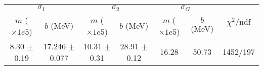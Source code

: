\begin{tabular}{cc|cc|cc||c}
\multicolumn{2}{c|}{$\sigma_1$} & \multicolumn{2}{|c}{$\sigma_2$} & \multicolumn{2}{|c}{$\sigma_G$}  & \multirow{2}{*}{$\chi^2/$ndf}\\
$m$ ($\times1e5$) & $b$ (MeV) & $m$ ($\times1e5$) & $b$ (MeV) & $m$ ($\times1e5$) & $b$ (MeV) & \\
\hline
8.30 $\pm$ 0.19 & 17.246 $\pm$ 0.077 & 10.31 $\pm$ 0.31 & 28.91 $\pm$ 0.12 & 16.28 & 50.73 & 1452/197\\
\end{tabular}
